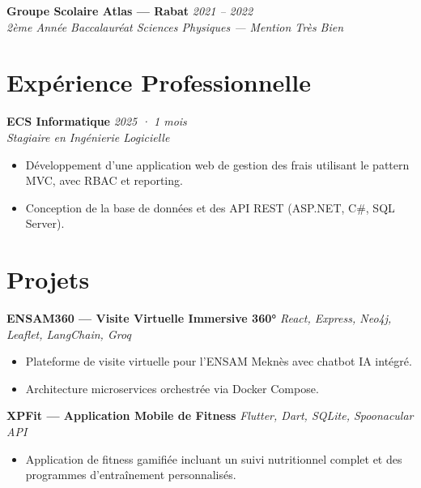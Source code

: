 \documentclass[a4paper,11pt]{article}
\newcommand{\entryhead}[3]{%
  \textbf{#1} \hfill \textit{#2} \\
  \textit{#3}
}
\begin{document}
\vspace{4pt}

\entryhead{Groupe Scolaire Atlas — Rabat}{2021 -- 2022}{2ème Année Baccalauréat Sciences Physiques — Mention Très Bien}

\section{Expérience Professionnelle}

\entryhead{ECS Informatique}{2025 · 1 mois}{Stagiaire en Ingénierie Logicielle}
\begin{itemize}[leftmargin=*, nosep, topsep=2pt]
  \item Développement d'une application web de gestion des frais utilisant le pattern MVC, avec RBAC et reporting.
  \item Conception de la base de données et des API REST (ASP.NET, C\#, SQL Server).
\end{itemize}

\section{Projets}

\textbf{ENSAM360 — Visite Virtuelle Immersive 360°} \hfill \textit{React, Express, Neo4j, Leaflet, LangChain, Groq}
\begin{itemize}[leftmargin=*, nosep, topsep=2pt]
  \item Plateforme de visite virtuelle pour l'ENSAM Meknès avec chatbot IA intégré.
  \item Architecture microservices orchestrée via Docker Compose.
\end{itemize}

\vspace{4pt}

\textbf{XPFit — Application Mobile de Fitness} \hfill \textit{Flutter, Dart, SQLite, Spoonacular API}
\begin{itemize}[leftmargin=*, nosep, topsep=2pt]
  \item Application de fitness gamifiée incluant un suivi nutritionnel complet et des programmes d'entraînement personnalisés.
\end{itemize}
\end{document}
